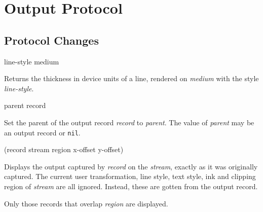 \chapter{Output Protocol}

\section{Protocol Changes}

 {line-style medium}

Returns the thickness in device units of a line,
rendered on \textit{medium} with the style \textit{line-style}.

 {parent record}

Set the parent of the output record \textit{record}
to \textit{parent}.  The value of \textit{parent} may be an output
record or \texttt{nil}.

{(record stream \optional region x-offset y-offset)}

Displays the output captured by \textit{record} on the
\textit{stream}, exactly as it was originally captured. The current
user transformation, line style, text style, ink and clipping region
of \textit{stream} are all ignored. Instead, these are gotten from the
output record.

Only those records that overlap \textit{region} are displayed.










